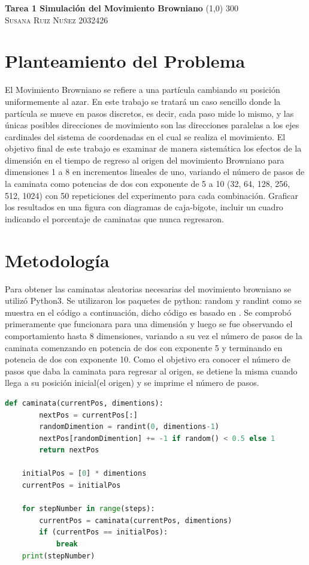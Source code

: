 \documentclass{article}
\begin{document}
	\begin{center}
	\huge{\textbf{Tarea 1 Simulación del Movimiento Browniano}}
	\line(1,0) {300}\\
	
	\textsc{ \Large Susana Ruiz Nuñez} 
	\textsc{ \Large 2032426}
	\end{center}


\section{Planteamiento del Problema} 
El Movimiento Browniano \cite{satu} se refiere a una partícula cambiando su posición uniformemente al azar. En este trabajo se tratará un caso sencillo donde la partícula se mueve en pasos discretos, es decir, cada paso mide lo mismo, y las únicas posibles direcciones de movimiento son las direcciones paralelas a los ejes cardinales del sistema de coordenadas en el cual se realiza el movimiento.  El objetivo final de este trabajo es examinar de manera sistemática los efectos de la dimensión en el tiempo de regreso al origen del movimiento Browniano para dimensiones 1 a 8 en incrementos lineales de uno, variando el número de pasos de la caminata como potencias de dos con exponente de 5 a 10 (32, 64, 128, 256, 512, 1024) con 50 repeticiones del experimento para cada combinación. Graficar los resultados en una figura con diagramas de caja-bigote, incluir un cuadro indicando el porcentaje de caminatas que nunca regresaron.

\section{Metodología}
Para obtener las caminatas aleatorias necesarias del movimiento browniano se utilizó Python3. Se utilizaron los paquetes de python: random y randint como se muestra en el código a continuación, dicho código es basado en \cite{satu}. Se comprobó primeramente que funcionara para una dimensión y luego se fue observando el comportamiento hasta 8 dimensiones, variando a su vez el número de pasos de la caminata comenzando en potencia de dos con exponente 5 y terminando en potencia de dos con exponente 10. Como el objetivo era conocer el número de pasos que daba la caminata para regresar al origen, se detiene la misma cuando llega a su posición inicial(el origen) y se imprime el número de pasos.
  
\begin{lstlisting}[language=Python]
	def caminata(currentPos, dimentions):
		nextPos = currentPos[:]
		randomDimention = randint(0, dimentions-1)
		nextPos[randomDimention] += -1 if random() < 0.5 else 1
		return nextPos
	
	initialPos = [0] * dimentions
	currentPos = initialPos
	
	for stepNumber in range(steps):
		currentPos = caminata(currentPos, dimentions)
		if (currentPos == initialPos):
			break
	print(stepNumber)
\end{lstlisting}
\end{document}
